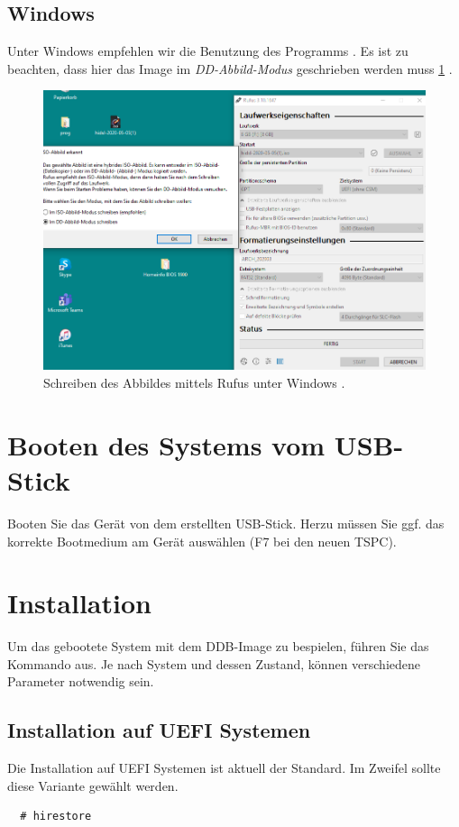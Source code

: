 \documentclass[a4paper,11pt,authoryear]{article}
\begin{document}
\subsection{Windows}
Unter Windows empfehlen wir die Benutzung des Programms .
Es ist zu beachten, dass hier das Image im \emph{DD-Abbild-Modus} geschrieben werden muss \ref{fig:rufus} .
\begin{figure}
  \begin{center}
    \includegraphics[scale=0.3]{ddb_rufus_win.png}
    \caption{Schreiben des Abbildes mittels Rufus unter Windows \cite{siebert_rufus}.}
    \label{fig:rufus}
  \end{center}
\end{figure}
\section{Booten des Systems vom USB-Stick}
Booten Sie das Gerät von dem erstellten USB-Stick. Herzu müssen Sie ggf. das korrekte Bootmedium am Gerät auswählen (F7 bei den neuen TSPC).

\section{Installation}
Um das gebootete System mit dem DDB-Image zu bespielen, führen Sie das Kommando  aus.
Je nach System und dessen Zustand, können verschiedene Parameter notwendig sein.
\subsection{Installation auf UEFI Systemen}
Die Installation auf UEFI Systemen ist aktuell der Standard. Im Zweifel sollte diese Variante gewählt werden.
\begin{verbatim}
  # hirestore
\end{verbatim}
\end{document}
